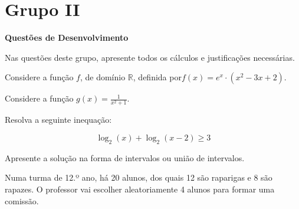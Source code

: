\documentclass[12pt,a4paper]{exam}
\begin{document}
\section*{Grupo II}
\textbf{Questões de Desenvolvimento}

Nas questões deste grupo, apresente todos os cálculos e justificações necessárias.

\begin{questions}

\question
Considere a função \(f\), de domínio \(\mathbb{R}\), definida por\( f(x) = e^{x} \cdot (x^2 - 3x + 2) \).


\question
Considere a função \( g(x) = \frac{1}{x^2 + 1} \).


\question
Resolva a seguinte inequação:

\[
\log_2(x) + \log_2(x - 2) \geq 3
\]

Apresente a solução na forma de intervalos ou união de intervalos.

\question
Numa turma de 12.º ano, há 20 alunos, dos quais 12 são raparigas e 8 são rapazes. O professor vai escolher aleatoriamente 4 alunos para formar uma comissão.

\begin{parts}

\end{parts}
\end{questions}
\end{document}
